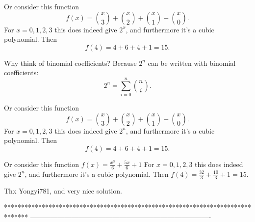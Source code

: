 


\begin{solution}
	Or consider this function
\[f(x)=\binom x3+\binom x2+\binom x1+\binom x0.\]
For $x=0,1,2,3$ this does indeed give $2^x$, and furthermore it's a cubic polynomial. Then
\[f(4)=4+6+4+1=15.\]

Why think of binomial coefficients? Because $2^n$ can be written with binomial coefficients:
\[2^n=\sum_{i=0}^n\binom ni.\]
\end{solution}



\begin{solution}
	\begin{tcolorbox}Or consider this function
\[f(x)=\binom x3+\binom x2+\binom x1+\binom x0.\]
For $x=0,1,2,3$ this does indeed give $2^n$, and furthermore it's a cubic polynomial. Then
\[f(4)=4+6+4+1=15.\]\end{tcolorbox}
Or consider this function
$f(x)=\frac{x^3}6+\frac{5x}6+1$
For $x=0,1,2,3$ this does indeed give $2^n$, and furthermore it's a cubic polynomial. Then
$f(4)=\frac{32}3+\frac{10}3+1=15$.
\end{solution}



\begin{solution}
	Thx Yongyi781, and very nice solution.
\end{solution}
*******************************************************************************
-------------------------------------------------------------------------------

